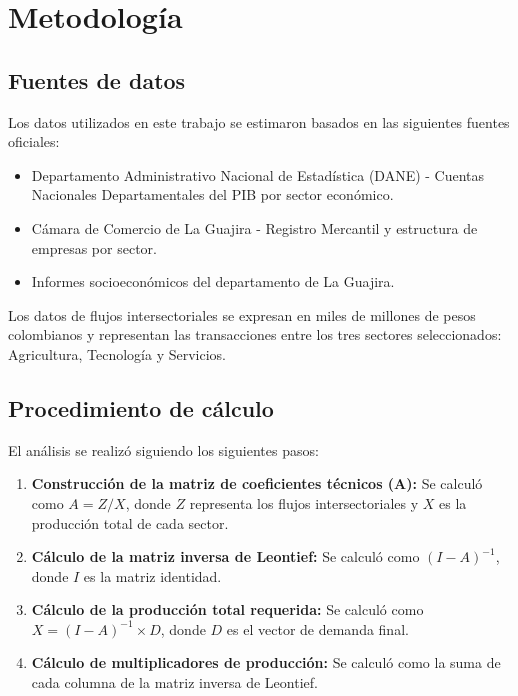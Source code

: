 \section{Metodología}

\subsection{Fuentes de datos}

Los datos utilizados en este trabajo se estimaron basados en las siguientes fuentes oficiales:

\begin{itemize}
    \item Departamento Administrativo Nacional de Estadística (DANE) - Cuentas Nacionales Departamentales del PIB por sector económico.
    \item Cámara de Comercio de La Guajira - Registro Mercantil y estructura de empresas por sector.
    \item Informes socioeconómicos del departamento de La Guajira.
\end{itemize}

Los datos de flujos intersectoriales se expresan en miles de millones de pesos colombianos y representan las transacciones entre los tres sectores seleccionados: Agricultura, Tecnología y Servicios.

\subsection{Procedimiento de cálculo}

El análisis se realizó siguiendo los siguientes pasos:

\begin{enumerate}
    \item \textbf{Construcción de la matriz de coeficientes técnicos (A):} Se calculó como $A = Z / X$, donde $Z$ representa los flujos intersectoriales y $X$ es la producción total de cada sector.

    \item \textbf{Cálculo de la matriz inversa de Leontief:} Se calculó como $(I - A)^{-1}$, donde $I$ es la matriz identidad.

    \item \textbf{Cálculo de la producción total requerida:} Se calculó como $X = (I - A)^{-1} \times D$, donde $D$ es el vector de demanda final.

    \item \textbf{Cálculo de multiplicadores de producción:} Se calculó como la suma de cada columna de la matriz inversa de Leontief.
\end{enumerate}

